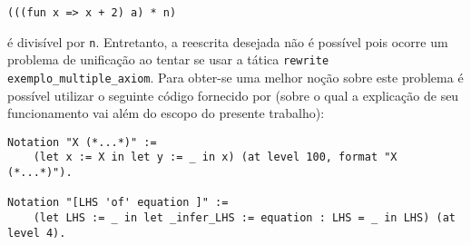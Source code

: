 {{    \begin{lstlisting}[language = coq,frame=single,tabsize=1]
(((fun x => x + 2) a) * n)
    \end{lstlisting} 
é divisível por \lstinline[language = coq]!n!. Entretanto, a reescrita desejada não é possível pois ocorre um problema de unificação ao tentar se usar a tática \lstinline[language = coq]!rewrite exemplo_multiple_axiom!. Para obter-se uma melhor noção sobre este problema é possível utilizar o seguinte código fornecido por \cite{assia_mahboubi_2022_7118596} (sobre o qual a explicação de seu funcionamento vai além do escopo do presente trabalho):
    \begin{lstlisting}[language = coq,frame=single,tabsize=1]
Notation "X (*...*)" :=
    (let x := X in let y := _ in x) (at level 100, format "X  (*...*)").

Notation "[LHS 'of' equation ]" := 
    (let LHS := _ in let _infer_LHS := equation : LHS = _ in LHS) (at level 4).


\end{lstlisting}}}

